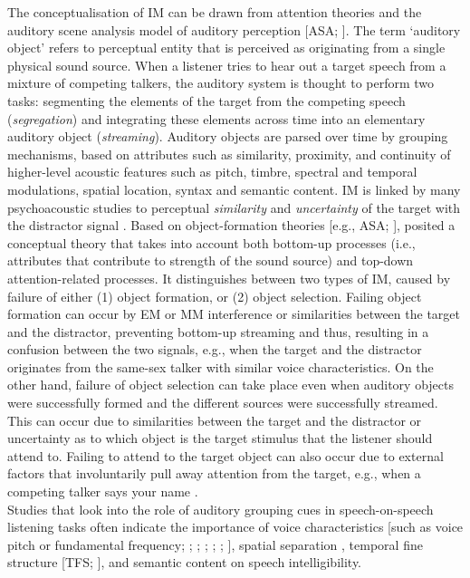 \documentclass[a4paper, twoside]{templates/ociamthesis}
\begin{document}
The conceptualisation of IM can be drawn from attention theories and the auditory scene analysis model of auditory perception {[}ASA; \textcite{Bergman1990}{]}. The term `auditory object' refers to perceptual entity that is perceived as originating from a single physical sound source. When a listener tries to hear out a target speech from a mixture of competing talkers, the auditory system is thought to perform two tasks: segmenting the elements of the target from the competing speech (\textit{segregation}) and integrating these elements across time into an elementary auditory object (\textit{streaming}). Auditory objects are parsed over time by grouping mechanisms, based on attributes such as similarity, proximity, and continuity of higher-level acoustic features such as pitch, timbre, spectral and temporal modulations, spatial location, syntax and semantic content. IM is linked by many psychoacoustic studies to perceptual \textit{similarity} and \textit{uncertainty} of the target with the distractor signal \autocites[e.g.,][]{Watson1987,Kidd2002,Durlach2003,Shinn-Cunningham2008}. Based on object-formation theories {[}e.g., ASA; \textcite{Bergman1990}{]}, \textcite{Shinn-Cunningham2008} posited a conceptual theory that takes into account both bottom-up processes (i.e., attributes that contribute to strength of the sound source) and top-down attention-related processes. It distinguishes between two types of IM, caused by failure of either (1) object formation, or (2) object selection. Failing object formation can occur by EM or MM interference or similarities between the target and the distractor, preventing bottom-up streaming and thus, resulting in a confusion between the two signals, e.g., when the target and the distractor originates from the same-sex talker with similar voice characteristics. On the other hand, failure of object selection can take place even when auditory objects were successfully formed and the different sources were successfully streamed. This can occur due to similarities between the target and the distractor or uncertainty as to which object is the target stimulus that the listener should attend to. Failing to attend to the target object can also occur due to external factors that involuntarily pull away attention from the target, e.g., when a competing talker says your name \autocite{Moray1959}.\\

Studies that look into the role of auditory grouping cues in speech-on-speech listening tasks often indicate the importance of voice characteristics {[}such as voice pitch or fundamental frequency; \textcite{Scheffers1983}; \textcite{Bergman1990}; \textcite{Brungart2001}; \textcite{Darwin2003}; \textcite{Leclere2017}; \textcite{Shen2017}{]}, spatial separation \autocite{Freyman1999,Best2011}, temporal fine structure {[}TFS; \textcite{Moore2008}{]}, and semantic content \autocite{VanEngen2007,Calandruccio2010,Brouwer2012} on speech intelligibility.\\
\end{document}

